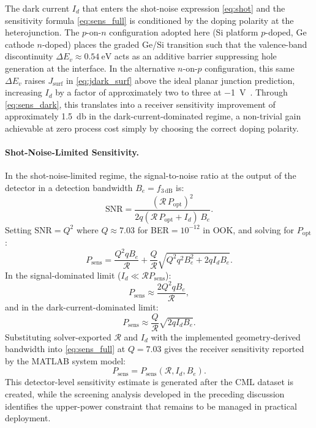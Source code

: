 The dark current $I_d$ that enters the shot-noise expression \cref{eq:shot}
and the sensitivity formula \cref{eq:sens_full} is conditioned by the doping
polarity at the heterojunction. The $p$-on-$n$ configuration adopted here
(Si platform $p$-doped, Ge cathode $n$-doped) places the graded Ge/Si transition
such that the valence-band discontinuity $\Delta E_v\approx\SI{0.54}{\electronvolt}$
acts as an additive barrier suppressing hole generation at the interface.
In the alternative $n$-on-$p$ configuration, this same $\Delta E_v$ raises
$J_{\mathrm{surf}}$ in \cref{eq:jdark_surf} above the ideal planar junction
prediction, increasing $I_d$ by a factor of approximately two to three at
\SI{-1}{\volt}~\cite{Alasio2024}. Through \cref{eq:sens_dark}, this translates
into a receiver sensitivity improvement of approximately \SI{1.5}{\decibel}
in the dark-current-dominated regime, a non-trivial gain achievable at zero
process cost simply by choosing the correct doping polarity.

\paragraph{Shot-Noise-Limited Sensitivity.}
\label{subsec:pd_sens}

In the shot-noise-limited regime, the signal-to-noise ratio at the output of
the detector in a detection bandwidth $B_e=f_{3\,\mathrm{dB}}$ is:
\begin{equation}
    \mathrm{SNR}
    = \frac{(\mathcal{R}\,P_{\mathrm{opt}})^2}
           {2q(\mathcal{R}\,P_{\mathrm{opt}}+I_d)\,B_e}.
    \label{eq:snr_shot}
\end{equation}
Setting $\mathrm{SNR}=Q^2$ where $Q\approx7.03$ for
BER$=10^{-12}$ in OOK, and solving for $P_{\mathrm{opt}}$:
\begin{equation}
    P_{\mathrm{sens}}
    = \frac{Q^2qB_e}{\mathcal{R}}
      + \frac{Q}{\mathcal{R}}\sqrt{Q^2q^2B_e^2+2qI_dB_e}.
    \label{eq:sens_full}
\end{equation}
In the signal-dominated limit ($I_d\ll\mathcal{R}P_{\mathrm{sens}}$):
\begin{equation}
    P_{\mathrm{sens}} \approx \frac{2Q^2qB_e}{\mathcal{R}},
    \label{eq:sens_signal}
\end{equation}
and in the dark-current-dominated limit:
\begin{equation}
    P_{\mathrm{sens}} \approx \frac{Q}{\mathcal{R}}\sqrt{2qI_dB_e}.
    \label{eq:sens_dark}
\end{equation}
Substituting solver-exported $\mathcal{R}$ and $I_d$ with the implemented
geometry-derived bandwidth into \cref{eq:sens_full} at $Q=7.03$ gives the
receiver sensitivity reported by the MATLAB system model:
\begin{equation}
    P_{\mathrm{sens}} = P_{\mathrm{sens}}(\mathcal{R}, I_d, B_e).
    \label{eq:sens_result}
\end{equation}
This detector-level sensitivity estimate is generated after the CML dataset is
created, while the screening analysis developed in the preceding discussion
identifies the upper-power constraint that remains to be managed in practical
deployment.


